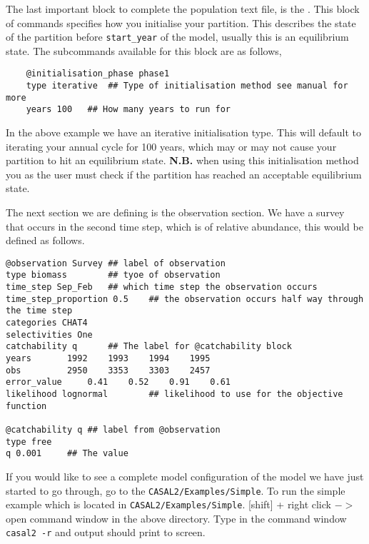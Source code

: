 The last important block to complete the population text file, is the . This block of commands specifies how you initialise your partition. This describes the state of the partition before \texttt{start\_year} of the model, usually this is an equilibrium state. The subcommands available for this block are as follows,
{\small{\begin{verbatim}
	@initialisation_phase phase1
	type iterative	## Type of initialisation method see manual for more
	years 100	## How many years to run for
\end{verbatim}}}

In the above example we have an iterative initialisation type. This will default to iterating your annual cycle for 100 years, which may or may not cause your partition to hit an equilibrium state. \textbf{N.B.} when using this initialisation method you as the user must check if the partition has reached an acceptable equilibrium state.

The next section we are defining is the observation section. We have a survey that occurs in the second time step, which is of relative abundance, this would be defined as follows.

{\small{\begin{verbatim}
@observation Survey	## label of observation
type biomass 		## tyoe of observation
time_step Sep_Feb	## which time step the observation occurs
time_step_proportion 0.5	## the observation occurs half way through the time step
categories CHAT4
selectivities One
catchability q		## The label for @catchability block
years 		1992 	1993 	1994 	1995 	
obs 		2950	3353	3303	2457
error_value 	0.41	0.52	0.91	0.61
likelihood lognormal		## likelihood to use for the objective function

@catchability q	## label from @observation
type free
q 0.001		## The value
		\end{verbatim}}}

If you would like to see a complete model configuration of the model we have just started to go through, go to the \texttt{CASAL2/Examples/Simple}. To run the simple example which is located in \texttt{CASAL2/Examples/Simple}. [shift] + right click $->$ open command window in the above directory. Type in the command window \texttt{casal2 -r} and output should print to screen.


